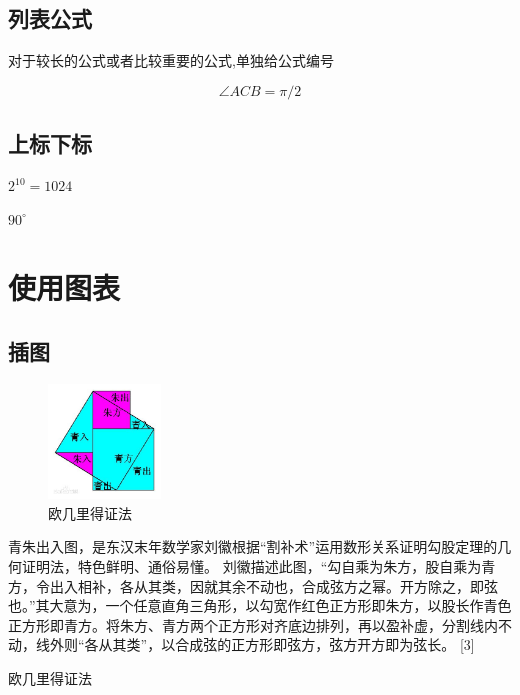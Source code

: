 \documentclass[UTF8]{ctexart}
\begin{document}
    \subsection{列表公式}
      对于较长的公式或者比较重要的公式,单独给公式编号

      \begin{equation}
        \angle ACB = \pi /2
      \end{equation}
    \subsection{上标下标}

      $2^{10} = 1024$

      $90^\circ$
  \section{使用图表}
      \subsection{插图}
      
        \begin{figure}[ht]%
          \centering%
          \includegraphics[width=3cm]{pythagorean_theorem.jpg}
          \caption{欧几里得证法}%
        \end{figure}
      青朱出入图，是东汉末年数学家刘徽根据“割补术”运用数形关系证明勾股定理的几何证明法，特色鲜明、通俗易懂。
      刘徽描述此图，“勾自乘为朱方，股自乘为青方，令出入相补，各从其类，因就其余不动也，合成弦方之幂。开方除之，即弦也。”其大意为，一个任意直角三角形，以勾宽作红色正方形即朱方，以股长作青色正方形即青方。将朱方、青方两个正方形对齐底边排列，再以盈补虚，分割线内不动，线外则“各从其类”，以合成弦的正方形即弦方，弦方开方即为弦长。 [3]

      欧几里得证法
\end{document}
